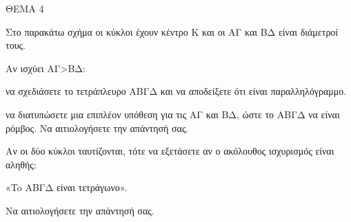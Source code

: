 
ΘΕΜΑ 4

Στο παρακάτω σχήμα οι κύκλοι έχουν κέντρο Κ και οι ΑΓ και ΒΔ είναι διάμετροί τους.



\begin{alist}
\item Αν ισχύει ΑΓ\textgreater ΒΔ:

\begin{rlist}
\item να σχεδιάσετε το τετράπλευρο ΑΒΓΔ και να αποδείξετε ότι είναι παραλληλόγραμμο.


\item να διατυπώσετε μια επιπλέον υπόθεση για τις ΑΓ και ΒΔ, ώστε το ΑΒΓΔ να είναι ρόμβος. Να αιτιολογήσετε την απάντησή σας.


\end{rlist}
\item Αν οι δύο κύκλοι ταυτίζονται, τότε να εξετάσετε αν ο ακόλουθος ισχυρισμός είναι αληθής:

«To ΑΒΓΔ είναι τετράγωνο».

Να αιτιολογήσετε την απάντησή σας.

\end{alist}
